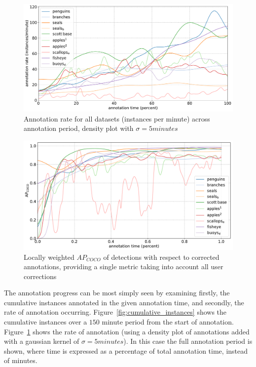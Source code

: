 \begin{figure}[ht!]
\centering
\includegraphics[width=1.0\linewidth]{charts/summaries/instance_rates.pdf}
\caption{ Annotation rate for all datasets (instances per minute) across annotation period, density plot with $\sigma=5minutes$ }
\label{fig:annotation_rate}
\end{figure}


\begin{figure}[ht!]
\centering
\includegraphics[width=1.0\linewidth]{charts/running_maps/overall.pdf}
\caption{ Locally weighted $AP_{COCO}$ of detections with respect to corrected annotations, providing a single metric taking into account all user corrections }
\label{fig:average_precision_test}
\end{figure}

The annotation progress can be most simply seen by examining firstly, the cumulative instances annotated in the given annotation time, and secondly, the rate of annotation occurring. Figure~\ref{fig:cumulative_instances} shows the cumulative instances over a $150$ minute period from the start of annotation. Figure~\ref{fig:annotation_rate} shows the rate of annotation (using a density plot of annotations added with a gaussian kernel of $\sigma = 5 minutes$). In this case the full annotation period is shown, where time is expressed as a percentage of total annotation time, instead of minutes.

